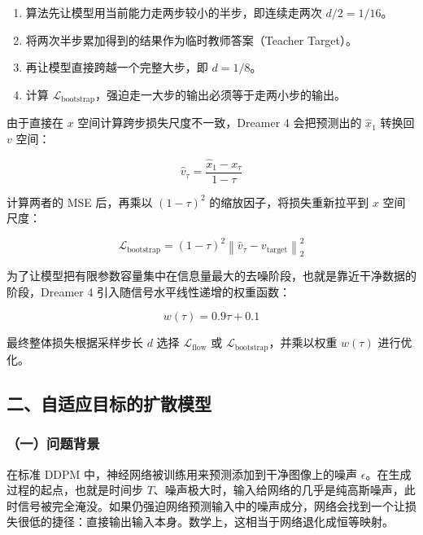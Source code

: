 \begin{enumerate}
\def\labelenumi{\arabic{enumi}.}
\tightlist
\item
  算法先让模型用当前能力走两步较小的半步，即连续走两次 \(d/2=1/16\)。
\item
  将两次半步累加得到的结果作为临时教师答案（Teacher Target）。
\item
  再让模型直接跨越一个完整大步，即 \(d=1/8\)。
\item
  计算 \(\mathcal{L}_{\mathrm{bootstrap}}\)，强迫走一大步的输出必须等于走两小步的输出。
\end{enumerate}

由于直接在 \(x\) 空间计算跨步损失尺度不一致，Dreamer 4 会把预测出的 \(\hat{x}_1\) 转换回 \(v\) 空间：

\[
\hat{v}_\tau=\frac{\hat{x}_1-x_\tau}{1-\tau}
\]

计算两者的 MSE 后，再乘以 \((1-\tau)^2\) 的缩放因子，将损失重新拉平到 \(x\) 空间尺度：

\[
\mathcal{L}_{\mathrm{bootstrap}}=(1-\tau)^2\left\|\hat{v}_\tau-v_{\mathrm{target}}\right\|_2^2
\]

为了让模型把有限参数容量集中在信息量最大的去噪阶段，也就是靠近干净数据的阶段，Dreamer 4 引入随信号水平线性递增的权重函数：

\[
w(\tau)=0.9\tau+0.1
\]

最终整体损失根据采样步长 \(d\) 选择 \(\mathcal{L}_{\mathrm{flow}}\) 或 \(\mathcal{L}_{\mathrm{bootstrap}}\)，并乘以权重 \(w(\tau)\) 进行优化。

\hypertarget{ux4e8cux81eaux9002ux5e94ux76eeux6807ux7684ux6269ux6563ux6a21ux578b}{%
\subsection{二、自适应目标的扩散模型}\label{ux4e8cux81eaux9002ux5e94ux76eeux6807ux7684ux6269ux6563ux6a21ux578b}}

\hypertarget{ux4e00ux95eeux9898ux80ccux666f-6}{%
\subsubsection{（一）问题背景}\label{ux4e00ux95eeux9898ux80ccux666f-6}}

在标准 DDPM 中，神经网络被训练用来预测添加到干净图像上的噪声 \(\epsilon\)。在生成过程的起点，也就是时间步 \(T\)、噪声极大时，输入给网络的几乎是纯高斯噪声，此时信号被完全淹没。如果仍强迫网络预测输入中的噪声成分，网络会找到一个让损失很低的捷径：直接输出输入本身。数学上，这相当于网络退化成恒等映射。

